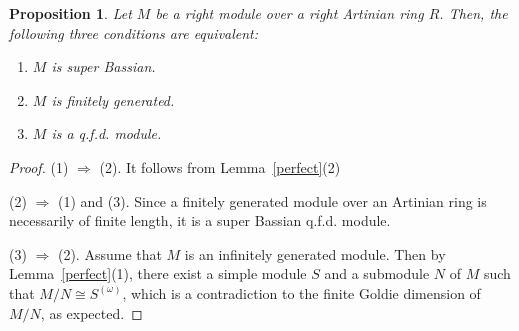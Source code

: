 \documentclass[10pt,a4paper]{amsart}
\newtheorem{prop}{Proposition}
\begin{document}
\begin{prop} Let $M$ be a right module over a right Artinian ring $R$. Then, the following three conditions are equivalent:
\begin{enumerate}
\item $M$ is super Bassian.
\item $M$ is finitely generated.
\item $M$ is a q.f.d. module.
\end{enumerate}	
\end{prop}

\begin{proof} (1) $\Rightarrow$ (2). It follows from Lemma~\ref{perfect}(2)

(2) $\Rightarrow$ (1) and (3). Since a finitely generated module over an Artinian ring is necessarily of finite length, it is a super Bassian q.f.d. module.
	
(3) $\Rightarrow$ (2). Assume that $M$ is an infinitely generated module. Then by
Lemma~\ref{perfect}(1), there exist a simple module \( S \) and a submodule \( N \) of $M$ such that \(M/N \cong S^{(\omega)}\), which is a contradiction to the finite Goldie dimension of $M/N$, as expected.
\end{proof}
\end{document}
